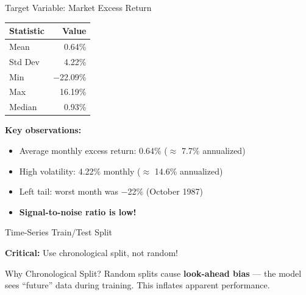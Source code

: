 \documentclass[10pt]{beamer}
\newcommand{\highlight}[1]{\textcolor{AccentOrange}{\textbf{#1}}}
\begin{document}
\begin{frame}{Target Variable: Market Excess Return}

  \begin{center}
  \begin{tabular}{lr}
    \toprule
    \textbf{Statistic} & \textbf{Value} \\
    \midrule
    Mean & 0.64\% \\
    Std Dev & 4.22\% \\
    Min & $-$22.09\% \\
    Max & 16.19\% \\
    Median & 0.93\% \\
    \bottomrule
  \end{tabular}
  \end{center}

  \vspace{0.5em}
  \textbf{Key observations:}
  \begin{itemize}
    \item Average monthly excess return: 0.64\% ($\approx$ 7.7\% annualized)
    \item High volatility: 4.22\% monthly ($\approx$ 14.6\% annualized)
    \item Left tail: worst month was $-$22\% (October 1987)
    \item \textbf{Signal-to-noise ratio is low!}
  \end{itemize}
\end{frame}


\begin{frame}[fragile]{Time-Series Train/Test Split}

  \textbf{Critical:} Use chronological split, not random!

  \vspace{0.3em}

  \vspace{0.5em}
  \begin{block}{Why Chronological Split?}
    Random splits cause \highlight{look-ahead bias} --- the model sees ``future'' data during training. This inflates apparent performance.
  \end{block}
\end{frame}
\end{document}
